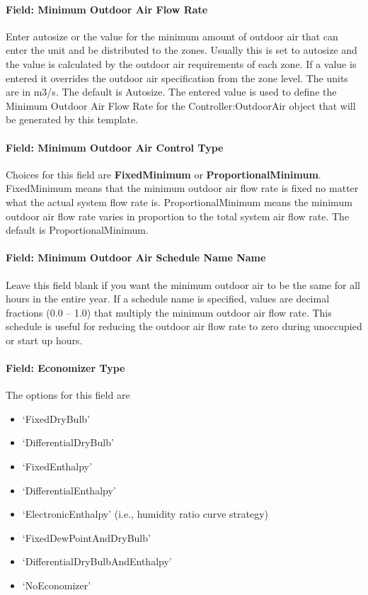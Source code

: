 \paragraph{Field: Minimum Outdoor Air Flow Rate}\label{field-minimum-outdoor-air-flow-rate-6}

Enter autosize or the value for the minimum amount of outdoor air that can enter the unit and be distributed to the zones. Usually this is set to autosize and the value is calculated by the outdoor air requirements of each zone. If a value is entered it overrides the outdoor air specification from the zone level. The units are in m3/s. The default is Autosize. The entered value is used to define the Minimum Outdoor Air Flow Rate for the Controller:OutdoorAir object that will be generated by this template.

\paragraph{Field: Minimum Outdoor Air Control Type}\label{field-minimum-outdoor-air-control-type-2}

Choices for this field are \textbf{FixedMinimum} or \textbf{ProportionalMinimum}. FixedMinimum means that the minimum outdoor air flow rate is fixed no matter what the actual system flow rate is. ProportionalMinimum means the minimum outdoor air flow rate varies in proportion to the total system air flow rate. The default is ProportionalMinimum.

\paragraph{Field: Minimum Outdoor Air Schedule Name Name}\label{field-minimum-outdoor-air-schedule-name-name-1}

Leave this field blank if you want the minimum outdoor air to be the same for all hours in the entire year. If a schedule name is specified, values are decimal fractions (0.0 -- 1.0) that multiply the minimum outdoor air flow rate. This schedule is useful for reducing the outdoor air flow rate to zero during unoccupied or start up hours.

\paragraph{Field: Economizer Type}\label{field-economizer-type-6}

The options for this field are

\begin{itemize}
\item
  `FixedDryBulb'
\item
  `DifferentialDryBulb'
\item
  `FixedEnthalpy'
\item
  `DifferentialEnthalpy'
\item
  `ElectronicEnthalpy' (i.e., humidity ratio curve strategy)
\item
  `FixedDewPointAndDryBulb'
\item
  `DifferentialDryBulbAndEnthalpy'
\item
  `NoEconomizer'
\end{itemize}

